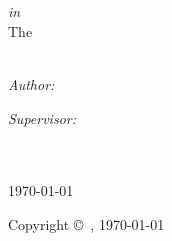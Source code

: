 
\begin{titlepage}
\begin{center}

{\scshape\LARGE \univname\par}\vspace{1.0cm} %

\HRule \\[0.4cm] %
{\huge \bfseries \ttitle\par}\vspace{0.4cm} %
\HRule \\[1.0cm] %
\centering
{}\par
   \vspace{0.5cm}  
\textit{\degreename}
    \vspace{0.5cm}  

\textit{in}\\[0.5cm]

The \deptname \\[0.5cm]

{\scshape\textsc{\large \subjectname}}\\[2.1cm]
 
\begin{minipage}[t]{0.4\textwidth}
\begin{flushleft} \large
\emph{Author:}\\
\href{http://www.johnsmith.com}{\authorname} %
\end{flushleft}
\end{minipage}
\begin{minipage}[t]{0.4\textwidth}
\begin{flushright} \large
\emph{Supervisor:} \\
\href{http://www.jamessmith.com}{\supname} %
\end{flushright}
\end{minipage}\\[1.8cm]
 
\vfill
\addressname\\[.3cm] \monthyeardate\today\\[.3cm] %
 
\vfill

{Copyright \copyright\ \authorname, \yeardate\today}
 
\vfill
\end{center}
\end{titlepage}
